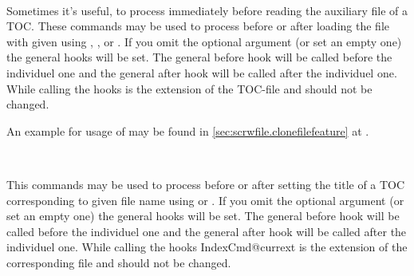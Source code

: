 \begin{Declaration}
  \\
\end{Declaration}
%
%
Sometimes it's useful, to process  immediately before
reading the auxiliary file of a TOC.  These commands may be used to process
 before or after loading the file with given
 using , , or
.  If you omit the optional argument (or set an empty
one) the general hooks will be set. The general before hook will be called
before the individuel one and the general after hook will be called after the
individuel one. While calling the hooks
 is the
extension of the TOC-file and should not be changed.

An example for usage of  may be
found in \autoref{sec:scrwfile.clonefilefeature} at
.
%
%

\begin{Declaration}
  \\
\end{Declaration}
%
%
This commands may be used to process  before or after
setting the title of a TOC corresponding to given file name 
using  or . If you omit the optional
argument (or set an empty one) the general hooks will be set. The general
before hook will be called before the individuel one and the general after
hook will be called after the individuel one. While calling the hooks
IndexCmd{@currext} is the
extension of the corresponding file and should not be changed.
%
%

